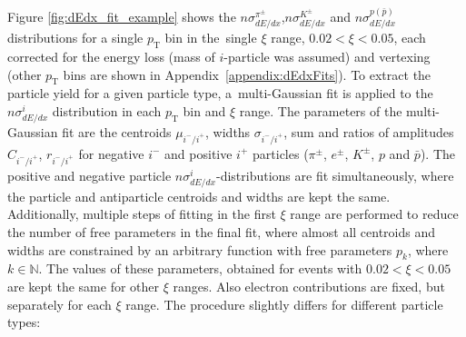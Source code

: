 \noindent Figure \ref{fig:dEdx_fit_example}
shows the $n\sigma^{\pi^\pm}_{dE/dx}$,$n\sigma^{K^\pm}_{dE/dx}$ and $n\sigma^{p(\bar{p})}_{dE/dx}$ distributions for a single $p_\textrm{T}$ bin in the~single $\xi$ range, $0.02 < \xi < 0.05$, each corrected for the energy loss (mass of $i$-particle was assumed) and vertexing (other $p_\textrm{T}$ bins are shown in Appendix~\ref{appendix:dEdxFits}). To extract the  particle yield for a given particle type,
a~multi-Gaussian fit is applied to the $n\sigma^i_{dE/dx}$ distribution in each $p_\textrm{T}$ bin and $\xi$ range. The parameters of the multi-Gaussian fit are the centroids $\mu_{i^-/i^+}$, widths $\sigma_{i^-/i^+}$, sum  and ratios  of amplitudes $C_{i^-/i^+}$, $r_{i^-/i^+}$ for negative $i^-$ and positive $i^+$ particles ($\pi^\pm$, $e^\pm$, $K^\pm$, $p$ and $\bar{p}$). The positive and negative particle
$n\sigma^{i}_{dE/dx}$-distributions are fit simultaneously, where the particle
and antiparticle centroids and widths are kept the same. Additionally, multiple steps of fitting in the first $\xi$ range are performed to reduce the number of free parameters in the final fit, where almost all centroids and widths are constrained  by an arbitrary function with free parameters $p_k$, where $k \in \mathbb N$. The values of these parameters, obtained for events with $0.02 < \xi < 0.05$ are kept the same for other $\xi$ ranges.
 Also electron contributions are  fixed, but separately for each $\xi$ range. The procedure slightly differs for different particle types:
